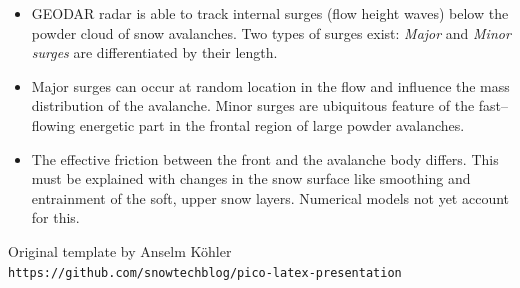 \documentclass[unknownkeysallowed,usepdftitle=false]{beamer}
\newcommand{\secvariable}{nothing}
\newcommand{\mysection}[1]{\renewcommand{\secvariable}{#1}
}
\begin{document}
\mysection{conclusion}
\begin{frame}\label{\secvariable}
  
  \begin{itemize}
   \item GEODAR radar is able to track internal surges (flow height waves)
below the powder cloud of snow avalanches.
   Two types of surges exist: \textit{Major} and \textit{Minor surges} are
differentiated by their length.
  \item Major surges can occur at random location in the flow and influence the
mass distribution of the avalanche.
   Minor surges are ubiquitous feature of the fast--flowing energetic
part in the frontal region of large powder avalanches. 
  \item The effective friction between the front and the avalanche body
differs. This must be explained with changes in the snow surface like smoothing
and entrainment of the soft, upper snow layers. Numerical models not yet account for this.

  \end{itemize}

Original template by Anselm K\"ohler\\ \texttt{https://github.com/snowtechblog/pico-latex-presentation}

\end{frame}
\end{document}
